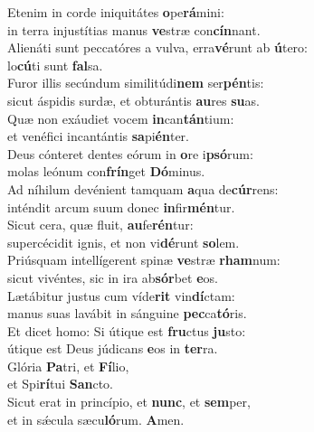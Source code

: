 \evenverse Etenim in corde iniquitátes \textbf{o}pe\textbf{rá}mini:~\*\\
\evenverse in terra injustítias manus \textbf{ve}stræ con\textbf{cín}nant.\\
\oddverse Alienáti sunt peccatóres a vulva, erra\textbf{vé}runt ab \textbf{ú}tero:~\*\\
\oddverse lo\textbf{cú}ti sunt \textbf{fal}sa.\\
\evenverse Furor illis secúndum similitúdi\textbf{nem} ser\textbf{pén}tis:~\*\\
\evenverse sicut áspidis surdæ, et obturántis \textbf{au}res \textbf{su}as.\\
\oddverse Quæ non exáudiet vocem \textbf{in}can\textbf{tán}tium:~\*\\
\oddverse et venéfici incantántis \textbf{sa}pi\textbf{én}ter.\\
\evenverse Deus cónteret dentes eórum in \textbf{o}re i\textbf{psó}rum:~\*\\
\evenverse molas leónum con\textbf{frín}get \textbf{Dó}minus.\\
\oddverse Ad níhilum devénient tamquam \textbf{a}qua de\textbf{cúr}rens:~\*\\
\oddverse inténdit arcum suum donec \textbf{in}fir\textbf{mén}tur.\\
\evenverse Sicut cera, quæ fluit, \textbf{au}fe\textbf{rén}tur:~\*\\
\evenverse supercécidit ignis, et non vi\textbf{dé}runt \textbf{so}lem.\\
\oddverse Priúsquam intellígerent spinæ \textbf{ve}stræ \textbf{rham}num:~\*\\
\oddverse sicut vivéntes, sic in ira ab\textbf{sór}bet \textbf{e}os.\\
\evenverse Lætábitur justus cum víde\textbf{rit} vin\textbf{dí}ctam:~\*\\
\evenverse manus suas lavábit in sánguine \textbf{pec}ca\textbf{tó}ris.\\
\oddverse Et dicet homo: Si útique est \textbf{fru}ctus \textbf{ju}sto:~\*\\
\oddverse útique est Deus júdicans \textbf{e}os in \textbf{ter}ra.\\
\evenverse Glória \textbf{Pa}tri, et \textbf{Fí}lio,~\*\\
\evenverse et Spi\textbf{rí}tui \textbf{San}cto.\\
\oddverse Sicut erat in princípio, et \textbf{nunc}, et \textbf{sem}per,~\*\\
\oddverse et in sǽcula sæcu\textbf{ló}rum. \textbf{A}men.\\
